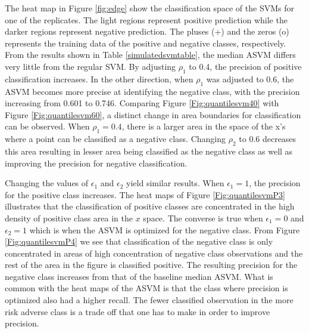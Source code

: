 \documentclass[twoside,11pt]{article}
\begin{document}
The heat map in Figure \ref{fig:edge} show the classification space of the SVMs for one of the replicates. The light regions represent positive prediction while the darker regions represent negative prediction. The pluses (+) and the zeros (o) represents the training data of the positive and negative classes, respectively. From the results shown in Table \ref{simulatedsvmtable}, the median ASVM differs very little from the regular SVM. By adjusting $\rho_1$ to 0.4, the precision of positive classification increases. In the other direction, when $\rho_1$ was adjusted to 0.6, the ASVM becomes more precise at identifying the negative class, with the precision increasing from 0.601 to 0.746. Comparing Figure \ref{Fig:quantilesvm40} with Figure \ref{Fig:quantilesvm60}, a distinct change in area boundaries for classification can be observed. When $\rho_1=0.4$, there is a larger area in the space of the x's where a point can be classified as a negative class. Changing $\rho_2$ to 0.6 decreases this area resulting in lesser area being classified as the negative class as well as improving the precision for negative classification.

Changing the values of $\epsilon_1$ and $\epsilon_2$ yield similar results. When $\epsilon_1=1$, the precision for the positive class increases. The heat maps of Figure \ref{Fig:quantilesvmP3} illustrates that the classification of positive classes are concentrated in the high density of positive class area in the $x$ space. The converse is true when $\epsilon_1=0$ and $\epsilon_2=1$ which is when the ASVM is optimized for the negative class. From Figure \ref{Fig:quantilesvmP4} we see that classification of the negative class is only concentrated in areas of high concentration of negative class observations and the rest of the area in the figure is classified positive. The resulting precision for the negative class increases from that of the baseline median ASVM. What is common with the heat maps of the ASVM is that the class where precision is optimized also had a higher recall. The fewer classified observation in the more risk adverse class is a trade off that one has to make in order to improve precision.
\end{document}

